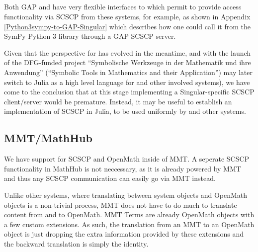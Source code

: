 \documentclass{deliverablereport}
\begin{document}
\subsection{\Singular}

Both GAP and \Sage have very flexible interfaces to \Singular
which permit to provide access \Singular functionality via SCSCP
from these systems, for example, as shown in 
Appendix \ref{Python3sympy-to-GAP-Singular} which 
describes how one could call it from the SymPy Python 3 library 
through a GAP SCSCP server.


Given that the perspective for \Singular has evolved in the meantime,
and with the launch of the DFG-funded project 
``Symbolische Werkzeuge in der Mathematik und ihre Anwendung''
(``Symbolic Tools in Mathematics and their Application'')
\Singular may later switch to Julia as a high level language 
for \Singular and other involved systems), we have come to the
conclusion that at this stage implementing a Singular-specific
SCSCP client/server would be premature. Instead, it may be useful
to establish an implementation of SCSCP in Julia, to be used 
uniformly by \Singular and other systems.


\subsection{MMT/MathHub}

We have support for SCSCP and OpenMath inside of MMT.  A seperate
SCSCP functionality in MathHub is not neccessary, as it is already
powered by MMT and thus any SCSCP communication can easily go via MMT
instead.

Unlike other systems, where translating between system objects and
OpenMath objects is a non-trivial process, MMT does not have to do
much to translate content from and to OpenMath.  MMT Terms are already
OpenMath objects with a few custom extensions.  As such, the
translation from an MMT to an OpenMath object is just dropping the
extra information provided by these extensions and the backward
translation is simply the identity.
\end{document}
